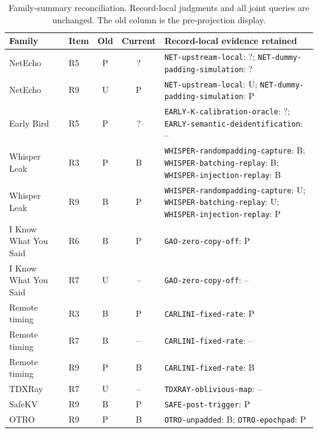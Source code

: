 \begin{table}[ht]\centering\footnotesize
\caption{Family-summary reconciliation. Record-local judgments and all joint queries are unchanged. The old column is the pre-projection display.}\label{tab:r32-reconciliation}
\begin{tabular}{@{}llccp{}@{}}\toprule
Family & Item & Old & Current & Record-local evidence retained\\\midrule
NetEcho~\cite{netecho2025} & R5 & P & ? & \texttt{NET-\allowbreak{}upstream-\allowbreak{}local}: ?; \texttt{NET-\allowbreak{}dummy-\allowbreak{}padding-\allowbreak{}simulation}: ?\\
NetEcho~\cite{netecho2025} & R9 & U & P & \texttt{NET-\allowbreak{}upstream-\allowbreak{}local}: U; \texttt{NET-\allowbreak{}dummy-\allowbreak{}padding-\allowbreak{}simulation}: P\\
Early Bird~\cite{earlybird2025} & R5 & P & ? & \texttt{EARLY-\allowbreak{}K-\allowbreak{}calibration-\allowbreak{}oracle}: ?; \texttt{EARLY-\allowbreak{}semantic-\allowbreak{}deidentification}: --\\
Whisper Leak~\cite{whisperleak2025} & R3 & P & B & \texttt{WHISPER-\allowbreak{}randompadding-\allowbreak{}capture}: B; \texttt{WHISPER-\allowbreak{}batching-\allowbreak{}replay}: B; \texttt{WHISPER-\allowbreak{}injection-\allowbreak{}replay}: B\\
Whisper Leak~\cite{whisperleak2025} & R9 & B & P & \texttt{WHISPER-\allowbreak{}randompadding-\allowbreak{}capture}: U; \texttt{WHISPER-\allowbreak{}batching-\allowbreak{}replay}: U; \texttt{WHISPER-\allowbreak{}injection-\allowbreak{}replay}: P\\
I Know What You Said~\cite{gao2025iknow} & R6 & B & P & \texttt{GAO-\allowbreak{}zero-\allowbreak{}copy-\allowbreak{}off}: P\\
I Know What You Said~\cite{gao2025iknow} & R7 & U & -- & \texttt{GAO-\allowbreak{}zero-\allowbreak{}copy-\allowbreak{}off}: --\\
Remote timing~\cite{carlini2024remote} & R3 & B & P & \texttt{CARLINI-\allowbreak{}fixed-\allowbreak{}rate}: P\\
Remote timing~\cite{carlini2024remote} & R7 & B & -- & \texttt{CARLINI-\allowbreak{}fixed-\allowbreak{}rate}: --\\
Remote timing~\cite{carlini2024remote} & R9 & P & B & \texttt{CARLINI-\allowbreak{}fixed-\allowbreak{}rate}: B\\
TDXRay~\cite{hornetz2026tdxray} & R7 & U & -- & \texttt{TDXRAY-\allowbreak{}oblivious-\allowbreak{}map}: --\\
SafeKV~\cite{chu2025safekv} & R9 & B & P & \texttt{SAFE-\allowbreak{}post-\allowbreak{}trigger}: P\\
OTRO~\cite{lee2026otro} & R9 & P & B & \texttt{OTRO-\allowbreak{}unpadded}: B; \texttt{OTRO-\allowbreak{}epochpad}: P\\
\bottomrule\end{tabular}\end{table}
